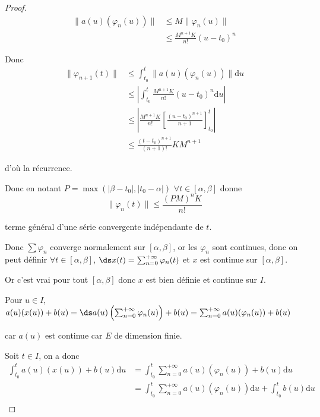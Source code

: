 \begin{proof}
    \begin{align}
        \| a(u)(\varphi_n(u)) \| & \leqslant M \| \varphi_n(u) \| \\
        & \leqslant \frac{M^{n + 1} K}{n!}(u - t_0)^n
    \end{align}

    Donc 
    \begin{align}
        \| \varphi_{n + 1}(t) \| & \leqslant \int_{t_0}^{t} \| a(u)(\varphi_n(u)) \| \mathrm d u \\
        & \leqslant \left| \int_{t_0}^{t} \frac{M^{n + 1}K}{n!} (u - t_0)^n \mathrm d u \right| \\
        & \leqslant \left| \frac{M^{n + 1} K }{n!} \left[ \frac{(u - t_0)^{n + 1}}{n + 1} \right]_{t_0}^{t} \right| \\
        & \leqslant \frac{(t - t_0)^{n + 1}}{(n + 1)!} K M^{n + 1}
    \end{align}

    d'où la récurrence. 

    Donc en notant $P = \max (|\beta - t_0|, |t_0 - \alpha|)$ 
    $\forall t \in [\alpha, \beta]$ donne 
    $$\| \varphi_n(t) \| \leqslant \frac{(PM)^n K }{n!}$$

    terme général d'une série convergente indépendante de $t$. 

    Donc $\sum \varphi_n$ converge normalement sur $[\alpha, \beta]$, or 
    les $\varphi_n$ sont continues, donc on peut définir 
    $\forall t \in [\alpha, \beta]$, $\ds x(t) = \sum_{n = 0}^{+ \infty} \varphi_n(t)$ et 
    $x$ est continue sur $[\alpha, \beta]$.

    Or c'est vrai pour tout $[\alpha, \beta]$ donc $x$ est bien définie et continue sur $I$. 

    Pour $u \in I$, $a(u)(x(u)) + b(u) = \ds a(u) \left( \sum_{n = 0}^{+ \infty} \varphi_n(u) \right) + b(u) = \sum_{n = 0}^{+ \infty} a(u)(\varphi_n(u)) + b(u)$

    car $a(u)$ est continue car $E$ de dimension finie. 

    Soit $t \in I$, on a donc 
    \begin{align}
        \int_{t_0}^{t} a(u)(x(u)) + b(u) \mathrm d u & = \int_{t_0}^{t} \sum_{n = 0}^{+ \infty} a(u)(\varphi_n(u)) + b(u) \mathrm d u \\
        & = \int_{t_0}^{t} \sum_{n = 0}^{+ \infty} a(u)(\varphi_n(u)) \mathrm d u + \int_{t_0}^{t} b(u) \mathrm d u \\
    \end{align}


\end{proof}
